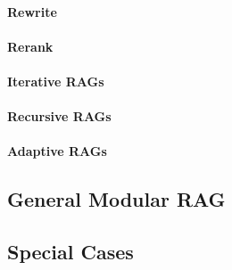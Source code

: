 \paragraph{Rewrite}
\label{sec:rewrite}

\paragraph{Rerank}
\label{sec:rerank}

\paragraph{Iterative RAGs}
\label{sec:iterative}

\paragraph{Recursive RAGs}
\label{sec:recursive}

\paragraph{Adaptive RAGs}
\label{sec:adaptive}

\subsection{General Modular RAG}
\label{sec:modular_rag}

\subsection{Special Cases}
\label{sec:special_cases}